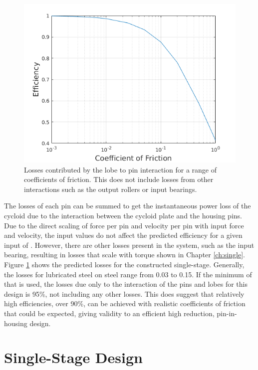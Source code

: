 \begin{figure}[t]
	\centering
	\includegraphics[width=0.75\linewidth]{fig/single_stage_loss}
   \caption{Losses contributed by the lobe to pin interaction for a range of coefficients of friction. This does not include losses from other interactions such as the output rollers or input bearings.}
   \label{fig:single_stage_losses}
\end{figure}



The losses of each pin can be summed to get the instantaneous power loss of the cycloid due to the interaction between the cycloid plate and the housing pins. Due to the direct scaling of force per pin and velocity per pin with input force and velocity, the input values do not affect the predicted efficiency for a given input of \textmu. However, there are other losses present in the system, such as the input bearing, resulting in losses that scale with torque shown in Chapter \ref{ch:single}. Figure \ref{fig:single_stage_losses} shows the predicted losses for the constructed single-stage. Generally, the losses for lubricated steel on steel range from 0.03 to 0.15. If the minimum of that is used, the losses due only to the interaction of the pins and lobes for this design is 95\%, not including any other losses. This does suggest that relatively high efficiencies, over 90\%, can be achieved with realistic coefficients of friction that could be expected, giving validity to an efficient high reduction, pin-in-housing design. 

\section{Single-Stage Design} \label{ch:design:single}


